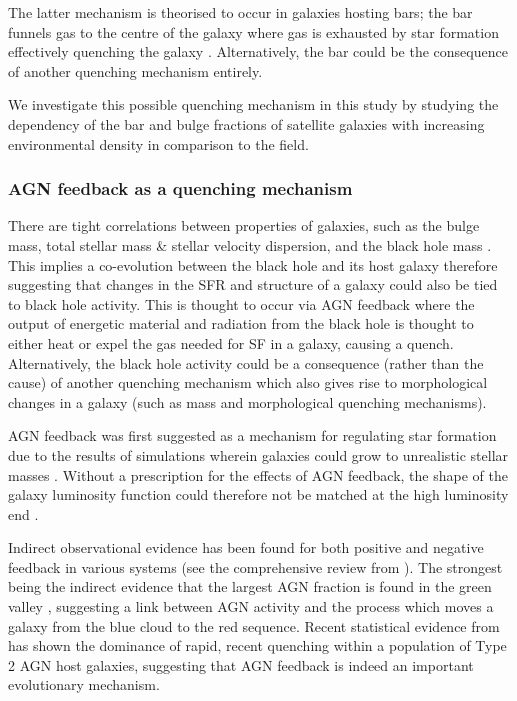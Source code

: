 \documentclass[useAMS,usenatbib]{mn2e}
\def\minor		{\color{minorcol}}
\begin{document}
The latter mechanism is theorised to occur in galaxies hosting bars; the bar funnels gas to the centre of the galaxy \citep{athanassoula92a} where gas is exhausted by star formation effectively quenching the galaxy \citep{zurita04, sheth05}. {\minor Alternatively, the bar could be the consequence of another quenching mechanism entirely.}

We investigate this possible quenching mechanism in this study by studying the dependency of the bar and bulge fractions of satellite galaxies {\minor with increasing environmental density} in comparison to the field.  

\subsubsection{AGN feedback as a quenching mechanism}\label{sec:agnquench}

There are tight correlations between properties of galaxies, such as the bulge mass, total stellar mass \& stellar velocity dispersion, and the black hole mass \citep{magorrian98, marconi03, haringrix04}. This implies a co-evolution between the black hole and its host galaxy therefore suggesting that changes in the SFR and structure of a galaxy could also be tied to black hole activity. This is thought to occur via AGN feedback where the output of energetic material and radiation from the black hole is thought to either heat or expel the gas needed for SF in a galaxy, causing a quench. {\minor Alternatively, the black hole activity could be a consequence (rather than the cause) of another quenching mechanism which also gives rise to morphological changes in a galaxy (such as mass and morphological quenching mechanisms).}

AGN feedback was first suggested as a mechanism for regulating star formation due to the results of simulations wherein galaxies could grow to unrealistic stellar masses \citep{silk98, Bower06, Croton06, somerville08}. Without a prescription for the effects of AGN feedback, the shape of the galaxy luminosity function could therefore not be matched at the high luminosity end \citep{baugh98, baugh05, kauffmann99a, kauffmann99b, somerville01, kitzbichler06}. 

Indirect observational evidence has been found for both positive and negative feedback in various systems (see the comprehensive review from \citealt{fabian12}). The strongest being the indirect evidence that the largest AGN fraction is found in the green valley {\minor\citep{Martin07, cowie08, Hickox09, schawinski10a}}, suggesting a link between AGN activity and the process which moves a galaxy from the blue cloud to the red sequence. Recent statistical evidence from \cite{smethurst16} has shown the dominance of rapid, recent quenching within a population of Type 2 AGN host galaxies, suggesting that AGN feedback is indeed an important evolutionary mechanism. 
\end{document}
